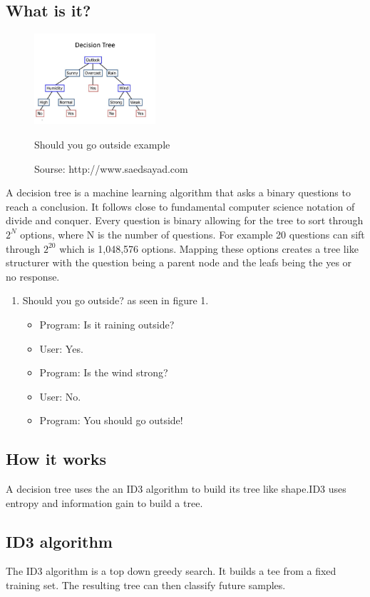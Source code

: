 \documentclass[a4paper]{article}
\begin{document}
\subsection{What is it?}
\begin{figure}
\centering
\includegraphics[width=0.4\textwidth]{Decision_Tree.jpg}
\caption{\label{fig:Tree}Sourse: http://www.saedsayad.com}
Should you go outside example
\end{figure}
A decision tree is a machine learning algorithm that asks a binary questions to reach a conclusion. It follows close to fundamental computer science notation of divide and conquer. Every question is binary allowing for the tree to sort through $2^N$ options, where N is the number of questions. For example 20 questions can sift through $2^{20}$ which is 1,048,576 options. Mapping these options creates a tree like structurer with the question being a parent node and the leafs being the yes or no response.
\begin{enumerate}
\centering
\item Should you go outside? as seen in figure 1.
\begin{itemize}
  \centering
  \item Program: Is it raining outside?
  \item User: Yes.
  \item Program: Is the wind strong?
  \item User: No.
  \item Program: You should go outside!
\end{itemize}
\end{enumerate}
\subsection{How it works}
A decision tree uses the an ID3 algorithm to build its tree like shape.ID3 uses entropy and information gain to build a tree.
\subsection{ID3 algorithm}
The ID3 algorithm is a top down greedy search. It builds a tee from a fixed training set. The resulting tree can then classify future samples.
\end{document}
